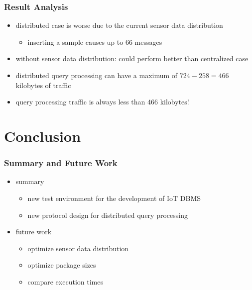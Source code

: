 \documentclass[english,10pt,xcolor=colortbl,compress]{beamer}
\begin{document}
\begin{frame}
	\frametitle{Result Analysis}
    \begin{itemize}
        \item distributed case is worse due to the current sensor data distribution
        \begin{itemize}
            \item inserting a sample causes up to 66 messages
        \end{itemize}
        \item without sensor data distribution: could perform better than centralized case
    \end{itemize}
    
    
    \begin{table}[htpb]
\end{table}
        \begin{itemize}
        \item distributed query processing can have a maximum of $724 - 258 = 466$ kilobytes of traffic
        \item query processing traffic is always less than $466$ kilobytes!
    \end{itemize}
\end{frame}

\section{Conclusion}
\begin{frame}
	\frametitle{Summary and Future Work}
	\begin{itemize}
		\item summary
		\begin{itemize}
			\item new test environment for the development of IoT DBMS
			\item new protocol design for distributed query processing
		\end{itemize}
		\item future work
		\begin{itemize}
			\item optimize sensor data distribution
			\item optimize package sizes
			\item compare execution times
		\end{itemize}
	\end{itemize}
\end{frame}
\end{document}
